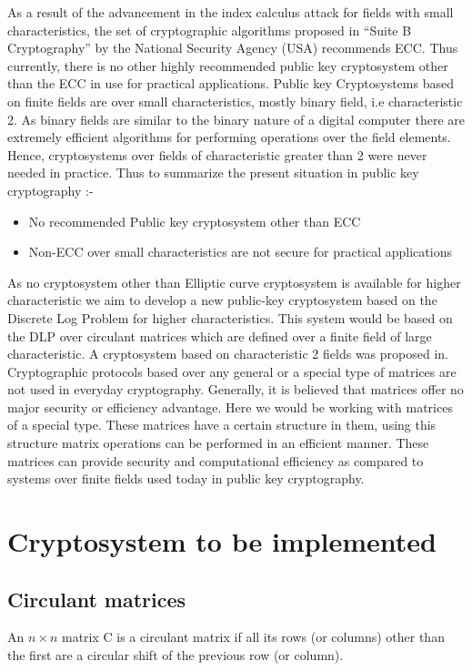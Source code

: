 As a result of the advancement in the index calculus attack for fields with small characteristics, the set of cryptographic algorithms
proposed in ``Suite B Cryptography''  by the National Security Agency (USA) recommends ECC.
Thus currently, there is no other highly recommended public key cryptosystem other than the ECC in use for practical applications.
Public key Cryptosystems based on finite fields are over small characteristics, mostly binary field, i.e characteristic 2.
As binary fields are similar to the binary nature of a digital computer there are extremely efficient algorithms for 
performing operations over the field elements. 
Hence, cryptosystems over fields of characteristic greater than 2 were never needed in practice.\newline
Thus to summarize the present situation in public key cryptography :-

\begin{itemize}
  \item No recommended Public key cryptosystem other than ECC
  \item Non-ECC over small characteristics are not secure for practical applications
\end{itemize}

As no cryptosystem other than Elliptic curve cryptosystem is available for higher characteristic we aim to develop a new public-key
cryptosystem based on the Discrete Log Problem for higher characteristics.
This system would be based on the DLP over circulant matrices which are defined over a finite field of large characteristic.
A cryptosystem based on characteristic 2 fields was proposed in.
Cryptographic protocols based over any general or a special type of matrices are not used in everyday cryptography.
Generally, it is believed that matrices offer no major security or efficiency advantage.
Here we would be working with matrices of a special type.
These matrices have a certain structure in them, using this structure matrix operations can be performed in an efficient manner.
These matrices can provide security and computational efficiency as compared to systems over finite fields used today in public key cryptography.


\section{Cryptosystem to be implemented}

\subsection{Circulant matrices}
An $n \times n$ matrix C is a circulant matrix if all its rows (or columns) other than the first are a circular shift of the previous
row (or column).

